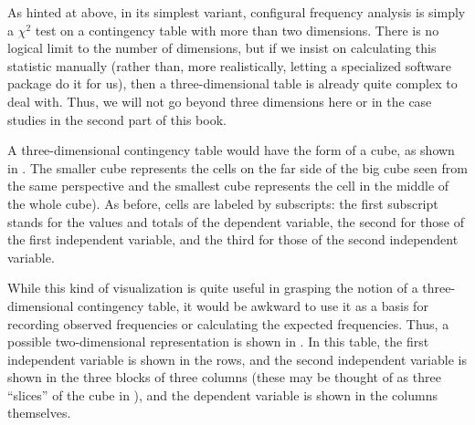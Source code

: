 
As hinted at above, in its simplest variant, configural  frequency analysis is simply a $\chi^2$  test on a contingency  table with more than two dimensions. There is no logical limit to the number of dimensions, but if we insist on calculating this statistic manually (rather than, more realistically, letting a specialized software package do it for us), then a three\hyp{}dimensional table is already quite complex to deal with. Thus, we will not go beyond three dimensions here or in the case studies in the second part of this book.

A three\hyp{}dimensional contingency  table would have the form of a cube, as shown in . The smaller cube represents the cells on the far side of the big cube seen from the same perspective and the smallest cube represents the cell in the middle of the whole cube). As before, cells are labeled by subscripts: the first subscript stands for the values and totals of the dependent variable, the second for those of the first independent variable, and the third for those of the second independent variable.\largerpage

While this kind of visualization is quite useful in grasping the notion of a three\hyp{}dimensional contingency  table, it would be awkward to use it as a basis for recording observed frequencies  or calculating the expected  frequencies. Thus, a possible two\hyp{}dimensional representation is shown in .  In this table, the first independent variable is shown in the rows, and the second independent variable is shown in the three blocks of three columns (these may be thought of as three ``slices'' of the cube in ), and the dependent variable is shown in the columns themselves.

